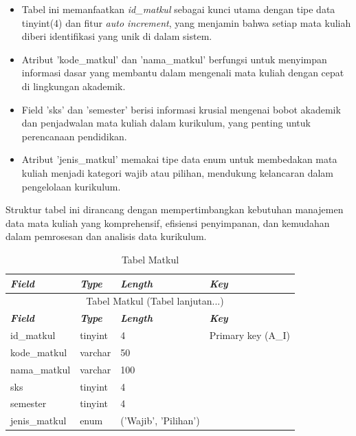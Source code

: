 \begin{enumerate}
	      \begin{itemize}
		      \item Tabel ini memanfaatkan \textit{id\_matkul} sebagai kunci utama dengan tipe data tinyint(4) dan fitur \textit{auto increment}, yang menjamin bahwa setiap mata kuliah diberi identifikasi yang unik di dalam sistem.
		      \item Atribut 'kode\_matkul' dan 'nama\_matkul' berfungsi untuk menyimpan informasi dasar yang membantu dalam mengenali mata kuliah dengan cepat di lingkungan akademik.
		      \item Field 'sks' dan 'semester' berisi informasi krusial mengenai bobot akademik dan penjadwalan mata kuliah dalam kurikulum, yang penting untuk perencanaan pendidikan.
		      \item Atribut 'jenis\_matkul' memakai tipe data enum untuk membedakan mata kuliah menjadi kategori wajib atau pilihan, mendukung kelancaran dalam pengelolaan kurikulum.
	      \end{itemize}

	      Struktur tabel ini dirancang dengan mempertimbangkan kebutuhan manajemen data mata kuliah yang komprehensif, efisiensi penyimpanan, dan kemudahan dalam pemrosesan dan analisis data kurikulum.

		      {
			      \fontsize{10}{12}\selectfont
			      \begin{longtable}{l l l l}
				      \caption{Tabel Matkul}
				      \label{admin}                                                                                       \\
				      \hline
				      \textbf{\textit{Field}} & \textbf{\textit{Type}} & \textbf{\textit{Length}} & \textbf{\textit{Key}} \\
				      \hline
				      \endfirsthead

				      \multicolumn{4}{c}{\tablename\ \thetable\ {Tabel Matkul} \space (Tabel lanjutan...)}                \\
				      \hline
				      \textbf{\textit{Field}} & \textbf{\textit{Type}} & \textbf{\textit{Length}} & \textbf{\textit{Key}} \\
				      \hline
				      \endhead

				      id\_matkul              & tinyint                & 4                        & Primary key (A\_I)    \\
				      kode\_matkul            & varchar                & 50                       &                       \\
				      nama\_matkul            & varchar                & 100                      &                       \\
				      sks                     & tinyint                & 4                        &                       \\
				      semester                & tinyint                & 4                        &                       \\
				      jenis\_matkul           & enum                   & ('Wajib', 'Pilihan')     &                       \\
				      \hline
			      \end{longtable}
		      }


\end{enumerate}

